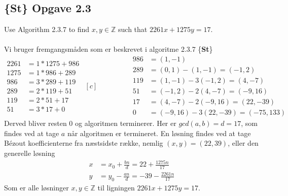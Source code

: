 \documentclass[12pt]{article}
\begin{document}
\subsection*{\{\textbf{St}\} Opgave 2.3}
Use Algorithm 2.3.7 to find $x, y\in \mathbb{Z}$ such that $2261x+1275y=17$.\\
\\
Vi bruger fremgangsmåden som er beskrevet i algoritme 2.3.7 \{\textbf{St}\}
\begin{equation*}
\begin{aligned}
2261&=1*1275+986 \\
1275&=1*986+289 \\
986&=3*289+119 \\
289&=2*119+51 \\
119&=2*51+17 \\
51&=3*17+0
\end{aligned}
\begin{aligned}[c]
\;\;\;\;\;\;\;\;\;\;\;\;\;\;\;
\end{aligned}
\begin{aligned}
986&=(1,-1) \\
289&=(0,1)-(1,-1)=(-1,2) \\
119&=(1,-1)-3(-1,2)=(4,-7) \\
51&=(-1,2)-2(4,-7)=(-9,16) \\
17&=(4,-7)-2(-9,16)=(22,-39) \\
0&=(-9,16)-3(22,-39)=(-75,133)
\end{aligned}
\end{equation*}
Derved bliver resten $0$ og algoritmen terminerer. Her er $gcd(a,b)=d=17$, som findes ved at tage $a$ når algoritmen er termineret. En løsning findes ved at tage Bézout koefficienterne fra næstsidste række, nemlig $(x,y)=(22,39)$, eller den generelle løsning
\begin{align*}
x&=x_0+\frac{bn}{d}=22+\frac{1275n}{17} \\
y&=y_0-\frac{an}{d}=-39-\frac{2261n}{17}
\end{align*}
Som er alle løsninger $x,y\in \mathbb{Z}$ til ligningen $2261x+1275y=17$.
\end{document}
